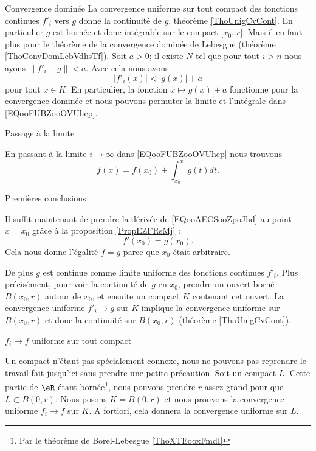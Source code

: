 \begin{normaltext}
\begin{subproof}
    \item[Convergence dominée]
        La convergence uniforme sur tout compact des fonctions continues \( f'_i\) vers \( g\) donne la continuité de \( g\), théorème \ref{ThoUnigCvCont}. En particulier \( g\) est bornée et donc intégrable sur le compact \( \mathopen[ x_0 , x \mathclose]\). Mais il en faut plus pour le théorème de la convergence dominée de Lebesgue (théorème \ref{ThoConvDomLebVdhsTf}). Soit \( a>0\); il existe \( N\) tel que pour tout \( i>n\) nous ayons \( \| f'_i-g \|<a\). Avec cela nous avons
        \begin{equation}
            | f'_i(x) |<| g(x) |+a
        \end{equation}
        pour tout \( x\in K\). En particulier, la fonction \( x\mapsto g(x)+a\) fonctionne pour la convergence dominée et nous pouvons permuter la limite et l'intégrale dans \eqref{EQooFUBZooOVUhep}.

    \item[Passage à la limite]

        En passant à la limite \( i\to \infty\) dans \eqref{EQooFUBZooOVUhep} nous trouvons
        \begin{equation}        \label{EQooAECSooZpoJhd}
            f(x)=f(x_0)+\int_{x_0}^xg(t)dt.
        \end{equation}
    \item[Premières conclusions]

        Il suffit maintenant de prendre la dérivée de \eqref{EQooAECSooZpoJhd} au point \( x=x_0\) grâce à la proposition \ref{PropEZFRsMj} :
        \begin{equation}
            f'(x_0)=g(x_0).
        \end{equation}
        Cela nous donne l'égalité \( f=g\) parce que \( x_0\) était arbitraire.

        De plus \( g\) est continue comme limite uniforme des fonctions continues \( f'_i\). Plus précisément, pour voir la continuité de \( g\) en \( x_0\), prendre un ouvert borné \( B(x_0,r)\) autour de \( x_0\), et ensuite un compact \( K\) contenant cet ouvert. La convergence uniforme \( f'_i\to g\) sur \( K\) implique la convergence uniforme sur \( B(x_0,r)\) et donc la continuité sur \( B(x_0,r)\) (théorème \ref{ThoUnigCvCont}).

    \item[\( f_i\to f\) uniforme sur tout compact]

        Un compact n'étant pas spécialement connexe, nous ne pouvons pas reprendre le travail fait jusqu'ici sans prendre une petite précaution. Soit un compact \( L\). Cette partie de \( \eR\) étant bornée\footnote{Par le théorème de Borel-Lebesgue \ref{ThoXTEooxFmdI}}, nous pouvons prendre \( r\) assez grand pour que \( L\subset \overline{ B(0,r) }\). Nous posons \( K=\overline{ B(0,r) }\) et nous prouvons la convergence uniforme \( f_i\to f\) sur \( K\). A fortiori, cela donnera la convergence uniforme sur \( L\).


\end{subproof}
\end{normaltext}
